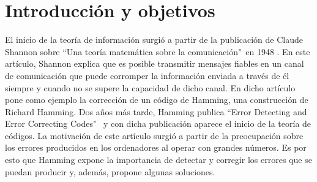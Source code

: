 \chapter*{Introducción y objetivos}

El inicio de la teoría de información surgió a partir de la publicación de Claude Shannon sobre ``Una teoría matemática sobre la comunicación"\ en 1948 \cite{Shannon_1948}. En este artículo, Shannon explica que es posible transmitir mensajes fiables en un canal de comunicación que puede corromper la información enviada a través de él siempre y cuando no se supere la capacidad de dicho canal. En dicho artículo pone como ejemplo la corrección de un código de Hamming, una construcción de Richard Hamming. Dos años más tarde, Hamming publica ``Error Detecting and Error Correcting Codes"\ \cite{Hamming_1950} y con dicha publicación aparece el inicio de la teoría de códigos. La motivación de este artículo surgió a partir de la preocupación sobre los errores producidos en los ordenadores al operar con grandes números. Es por esto que Hamming expone la importancia de detectar y corregir los errores que se puedan producir y, además, propone algunas soluciones.

